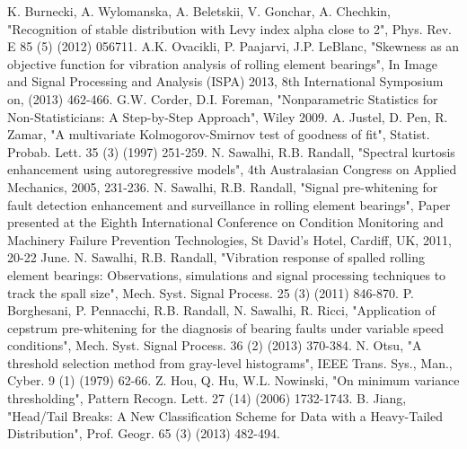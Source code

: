 \documentclass[11pt]{article} %
\begin{document}
\begin{thebibliography}{00}
 K. Burnecki, A. Wylomanska, A. Beletskii, V. Gonchar, A. Chechkin, "Recognition of stable distribution with Levy index alpha close to 2", Phys. Rev. E 85 (5) (2012) 056711. 
 A.K. Ovacikli, P. Paajarvi, J.P. LeBlanc, "Skewness as an objective function for vibration analysis of rolling element bearings", In Image and Signal Processing and Analysis (ISPA) 2013, 8th International Symposium on, (2013) 462-466.
 G.W. Corder, D.I. Foreman, "Nonparametric Statistics for Non-Statisticians: A Step-by-Step Approach", Wiley 2009.
 A. Justel, D. Pen, R. Zamar, "A multivariate Kolmogorov-Smirnov test of goodness of fit", Statist. Probab. Lett. 35 (3) (1997) 251-259.
 N. Sawalhi, R.B. Randall, "Spectral kurtosis enhancement using autoregressive models", 4th Australasian Congress on Applied Mechanics, 2005, 231-236. 
 N. Sawalhi, R.B. Randall, "Signal pre-whitening for fault detection enhancement and surveillance in rolling element bearings", Paper presented at the Eighth International Conference on Condition Monitoring and Machinery Failure Prevention Technologies, St David's Hotel, Cardiff, UK, 2011, 20-22 June.
 N. Sawalhi, R.B. Randall, "Vibration response of spalled rolling element bearings: Observations, simulations and signal processing techniques to track the spall size", Mech. Syst. Signal Process. 25 (3) (2011) 846-870.
 P. Borghesani, P. Pennacchi, R.B. Randall, N. Sawalhi, R. Ricci, "Application of cepstrum pre-whitening for the diagnosis of bearing faults under variable speed conditions", Mech. Syst. Signal Process. 36 (2) (2013) 370-384.
 N. Otsu, "A threshold selection method from gray-level histograms", IEEE Trans. Sys., Man., Cyber. 9 (1) (1979) 62-66.
 Z. Hou, Q. Hu, W.L. Nowinski, "On minimum variance thresholding", Pattern Recogn. Lett. 27 (14) (2006) 1732-1743.
 B. Jiang, "Head/Tail Breaks: A New Classification Scheme for Data with a Heavy-Tailed Distribution", Prof. Geogr. 65 (3) (2013) 482-494.

\end{thebibliography}
\end{document}
